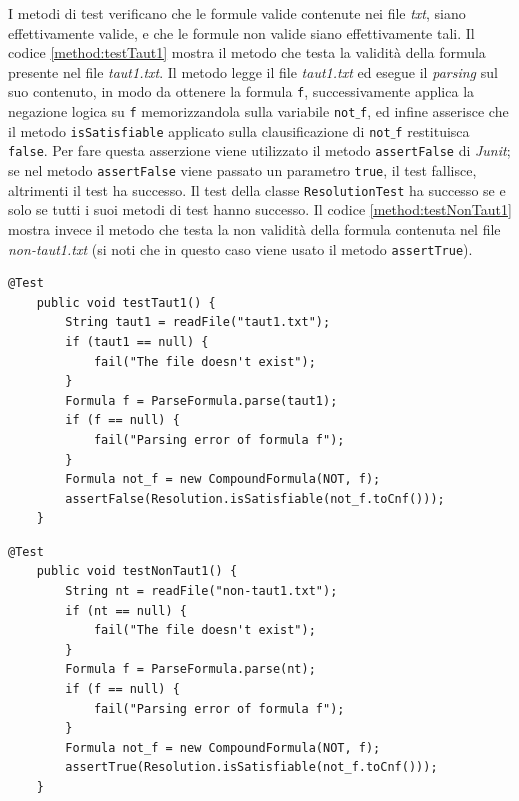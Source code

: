 \documentclass[a4paper,12pt]{report}
\begin{document}
I metodi di test verificano che le formule valide contenute nei file \emph{txt}, siano effettivamente valide, e che le formule non valide siano effettivamente tali. Il codice \ref{method:testTaut1} mostra il metodo che testa la validità della formula presente nel file \emph{taut1.txt}. Il metodo legge il file \emph{taut1.txt} ed esegue il \emph{parsing} sul suo contenuto, in modo da ottenere la formula \texttt{f}, successivamente applica la negazione logica su \texttt{f} memorizzandola sulla variabile \texttt{not$\_$f}, ed infine asserisce che il metodo \texttt{isSatisfiable} applicato sulla clausificazione di \texttt{not$\_$f} restituisca \texttt{false}. Per fare questa asserzione viene utilizzato il metodo \texttt{assertFalse} di \emph{Junit}; se nel metodo \texttt{assertFalse} viene passato un parametro \texttt{true}, il test fallisce, altrimenti il test ha successo. Il test della classe \texttt{ResolutionTest} ha successo se e solo se tutti i suoi metodi di test hanno successo. Il codice \ref{method:testNonTaut1} mostra invece il metodo che testa la non validità della formula contenuta nel file \emph{non-taut1.txt} (si noti che in questo caso viene usato il metodo \texttt{assertTrue}).

\begin{minipage}{\linewidth}
    \begin{lstlisting}[caption={Metodo che testa la validità della formula nel file \emph{taut1.txt}}, label={method:testTaut1}]
    @Test
    public void testTaut1() {
        String taut1 = readFile("taut1.txt");
        if (taut1 == null) {
            fail("The file doesn't exist");
        }
        Formula f = ParseFormula.parse(taut1);
        if (f == null) {
            fail("Parsing error of formula f");
        }
        Formula not_f = new CompoundFormula(NOT, f);
        assertFalse(Resolution.isSatisfiable(not_f.toCnf()));
    }
    \end{lstlisting}
\end{minipage}

\vspace{20pt}

\begin{minipage}{\linewidth}
    \begin{lstlisting}[caption={Metodo che testa la non validità della formula nel file \emph{non-taut1.txt}}, label={method:testNonTaut1}]
    @Test
    public void testNonTaut1() {
        String nt = readFile("non-taut1.txt");
        if (nt == null) {
            fail("The file doesn't exist");
        }
        Formula f = ParseFormula.parse(nt);
        if (f == null) {
            fail("Parsing error of formula f");
        }
        Formula not_f = new CompoundFormula(NOT, f);
        assertTrue(Resolution.isSatisfiable(not_f.toCnf()));
    }
    \end{lstlisting}
\end{minipage}
\end{document}
